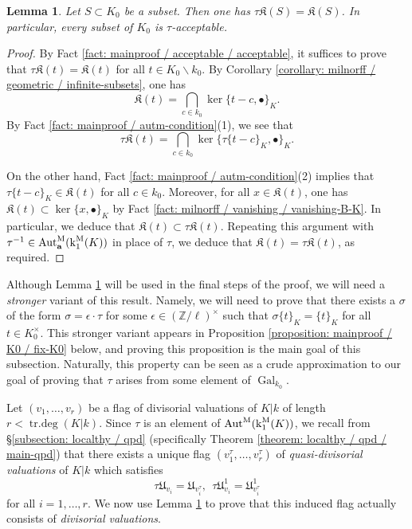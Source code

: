 \documentclass[11pt]{amsart}
\newtheorem{lemma}[proposition]{Lemma}
\theoremstyle{definition}
\theoremstyle{remark}
\numberwithin{equation}{section}
\DeclareMathOperator{\Aut}{Aut}
\DeclareMathOperator{\Gal}{Gal}
\DeclareMathOperator{\trdeg}{tr.deg}
\newcommand{\Z}{\mathbb{Z}}
\newcommand{\abf}{\mathbf{a}}
\newcommand{\Kfrak}{\mathfrak{K}}
\newcommand{\Ufrak}{\mathfrak{U}}
\newcommand{\Autm}{\Aut^{\rm M}}
\renewcommand{\k}{\operatorname{k}^{\rm M}}
\newcommand{\Galk}{{\Gal_{k_0}}}
\begin{document}
\begin{lemma}
\label{lemma: mainproof / K0 / fix-Kfrakt0}
  Let $S \subset K_0$ be a subset.
  Then one has $\tau\Kfrak(S) = \Kfrak(S)$.
  In particular, every subset of $K_0$ is $\tau$-acceptable.
\end{lemma}
\begin{proof}
  By Fact \ref{fact: mainproof / acceptable / acceptable}, it suffices to prove that $\tau\Kfrak(t) = \Kfrak(t)$ for all $t \in K_0 \smallsetminus k_0$.
  By Corollary \ref{corollary: milnorff / geometric / infinite-subsets}, one has
  \[ \Kfrak(t) = \bigcap_{c \in k_0} \ker\{t-c,\bullet\}_K. \]
  By Fact \ref{fact: mainproof / autm-condition}(1), we see that
  \[ \tau\Kfrak(t) = \bigcap_{c \in k_0} \ker\{\tau\{t-c\}_K,\bullet\}_K. \]

  On the other hand, Fact \ref{fact: mainproof / autm-condition}(2) implies that $\tau\{t-c\}_K \in \Kfrak(t)$ for all $c \in k_0$.
  Moreover, for all $x \in \Kfrak(t)$, one has $\Kfrak(t) \subset \ker\{x,\bullet\}_K$ by Fact \ref{fact: milnorff / vanishing / vanishing-B-K}.
  In particular, we deduce that $\Kfrak(t) \subset \tau \Kfrak(t)$.
  Repeating this argument with $\tau^{-1} \in \Autm_\abf(\k_1(K))$ in place of $\tau$, we deduce that $\Kfrak(t) = \tau\Kfrak(t)$, as required.
\end{proof}

Although Lemma \ref{lemma: mainproof / K0 / fix-Kfrakt0} will be used in the final steps of the proof, we will need a \emph{stronger} variant of this result.
Namely, we will need to prove that there exists a $\sigma$ of the form $\sigma = \epsilon \cdot \tau$ for some $\epsilon \in (\Z/\ell)^\times$ such that $\sigma \{t\}_K = \{t\}_K$ for all $t \in K_0^\times$.
This stronger variant appears in Proposition \ref{proposition: mainproof / K0 / fix-K0} below, and proving this proposition is the main goal of this subsection.
Naturally, this property can be seen as a crude approximation to our goal of proving that $\tau$ arises from some element of $\Galk$.

Let $(v_1,\ldots,v_r)$ be a flag of divisorial valuations of $K|k$ of length $r < \trdeg(K|k)$.
Since $\tau$ is an element of $\Autm(\k_1(K))$, we recall from \S\ref{subsection: localthy / qpd} (specifically Theorem \ref{theorem: localthy / qpd / main-qpd}) that there exists a unique flag $(v_1^\tau,\ldots,v_r^\tau)$ of \emph{quasi-divisorial valuations} of $K|k$ which satisfies
\[ \tau \Ufrak_{v_i} = \Ufrak_{v_i^\tau}, \ \ \tau \Ufrak_{v_i}^1 = \Ufrak_{v_i^\tau}^1 \]
for all $i = 1,\ldots,r$.
We now use Lemma \ref{lemma: mainproof / K0 / fix-Kfrakt0} to prove that this induced flag actually consists of \emph{divisorial valuations}.
\end{document}

